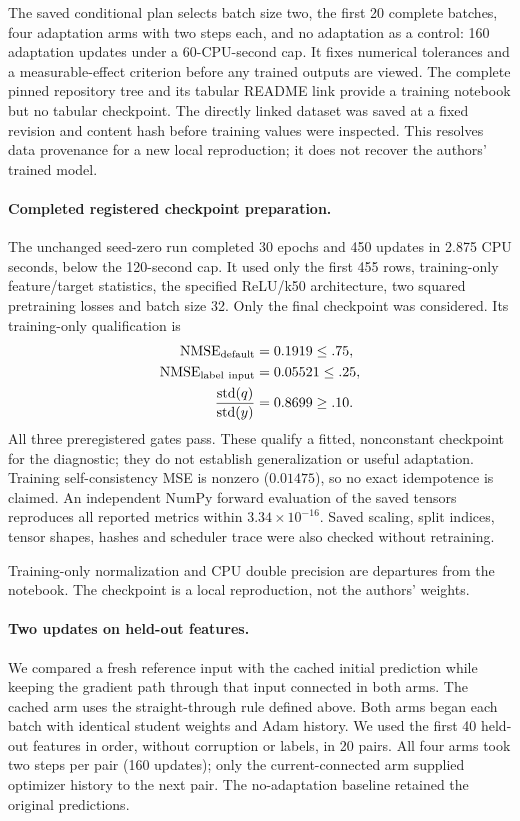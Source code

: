 \documentclass[11pt,a4paper]{article}
\begin{document}
The saved conditional plan selects batch size two, the first 20 complete
batches, four adaptation arms with two steps each, and no adaptation as a
control: 160 adaptation updates under a 60-CPU-second cap. It fixes numerical
tolerances and a measurable-effect criterion before any trained outputs
are viewed. The complete pinned repository tree and its tabular README
link provide a training notebook but no tabular checkpoint. The directly
linked dataset was saved at a fixed revision and content hash before
training values were inspected. This resolves data provenance for a new local
reproduction; it does not recover the authors' trained model.

\paragraph{Completed registered checkpoint preparation.}
The unchanged seed-zero run completed 30 epochs and 450 updates in
2.875 CPU seconds, below the 120-second cap. It used only the first 455
rows, training-only feature/target statistics, the specified ReLU/k50
architecture, two squared pretraining losses and batch size 32. Only
the final checkpoint was considered. Its training-only qualification is
\begin{align*}
 \mathrm{NMSE}_{\rm default}&=0.1919\le .75,\\
 \mathrm{NMSE}_{\rm label\ input}&=0.05521\le .25,\\
 \frac{\operatorname{std}(q)}{\operatorname{std}(y)}&=0.8699\ge .10.
\end{align*}
All three preregistered gates pass. These qualify a fitted, nonconstant
checkpoint for the diagnostic; they do not establish generalization or
useful adaptation. Training self-consistency MSE is nonzero ($0.01475$),
so no exact idempotence is claimed. An independent NumPy forward evaluation
of the saved tensors reproduces all reported metrics within $3.34\times10^{-16}$.
Saved scaling, split indices, tensor shapes, hashes and scheduler trace
were also checked without retraining.

Training-only normalization and CPU double precision are departures from the
notebook. The checkpoint is a local reproduction, not the authors' weights.

\paragraph{Two updates on held-out features.}
We compared a fresh reference input with the cached initial prediction while
keeping the gradient path through that input connected in both arms. The
cached arm uses the straight-through rule defined above. Both arms began
each batch with identical student weights and Adam history. We used the first
40 held-out features in order, without corruption or labels, in 20 pairs.
All four arms took two steps per pair (160 updates); only the current-connected
arm supplied optimizer history to the next pair. The no-adaptation baseline
retained the original predictions.
\end{document}
